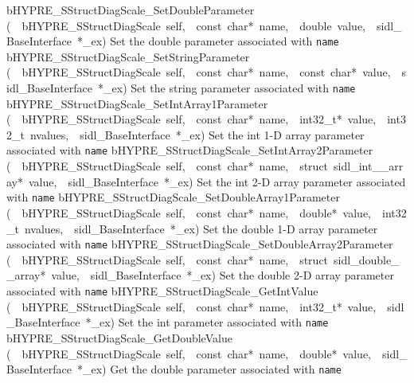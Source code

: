 \documentclass{article}
\begin{document}
\begin{cxxentry}
\begin{cxxentry}
\begin{cxxnames}
        {bHYPRE\_SStructDiagScale\_SetDoubleParameter}
        {(\ \ bHYPRE\_SStructDiagScale\ self,\ \ const\ char*\ name,\ \ double\ value,\ \ sidl\_BaseInterface\ *\_ex)}
        {
Set the double parameter associated with {\tt name}}
        {}
\label{cxx.8.1.18}
        {bHYPRE\_SStructDiagScale\_SetStringParameter}
        {(\ \ bHYPRE\_SStructDiagScale\ self,\ \ const\ char*\ name,\ \ const\ char*\ value,\ \ sidl\_BaseInterface\ *\_ex)}
        {
Set the string parameter associated with {\tt name}}
        {}
\label{cxx.8.1.19}
        {bHYPRE\_SStructDiagScale\_SetIntArray1Parameter}
        {(\ \ bHYPRE\_SStructDiagScale\ self,\ \ const\ char*\ name,\ \ int32\_t*\ value,\ \ int32\_t\ nvalues,\ \ sidl\_BaseInterface\ *\_ex)}
        {
Set the int 1-D array parameter associated with {\tt name}}
        {}
\label{cxx.8.1.20}
        {bHYPRE\_SStructDiagScale\_SetIntArray2Parameter}
        {(\ \ bHYPRE\_SStructDiagScale\ self,\ \ const\ char*\ name,\ \ struct\ sidl\_int\_\_array*\ value,\ \ sidl\_BaseInterface\ *\_ex)}
        {
Set the int 2-D array parameter associated with {\tt name}}
        {}
\label{cxx.8.1.21}
        {bHYPRE\_SStructDiagScale\_SetDoubleArray1Parameter}
        {(\ \ bHYPRE\_SStructDiagScale\ self,\ \ const\ char*\ name,\ \ double*\ value,\ \ int32\_t\ nvalues,\ \ sidl\_BaseInterface\ *\_ex)}
        {
Set the double 1-D array parameter associated with {\tt name}}
        {}
\label{cxx.8.1.22}
        {bHYPRE\_SStructDiagScale\_SetDoubleArray2Parameter}
        {(\ \ bHYPRE\_SStructDiagScale\ self,\ \ const\ char*\ name,\ \ struct\ sidl\_double\_\_array*\ value,\ \ sidl\_BaseInterface\ *\_ex)}
        {
Set the double 2-D array parameter associated with {\tt name}}
        {}
\label{cxx.8.1.23}
        {bHYPRE\_SStructDiagScale\_GetIntValue}
        {(\ \ bHYPRE\_SStructDiagScale\ self,\ \ const\ char*\ name,\ \ int32\_t*\ value,\ \ sidl\_BaseInterface\ *\_ex)}
        {
Set the int parameter associated with {\tt name}}
        {}
\label{cxx.8.1.24}
        {bHYPRE\_SStructDiagScale\_GetDoubleValue}
        {(\ \ bHYPRE\_SStructDiagScale\ self,\ \ const\ char*\ name,\ \ double*\ value,\ \ sidl\_BaseInterface\ *\_ex)}
        {
Get the double parameter associated with {\tt name}}
        {}
\label{cxx.8.1.25}

\end{cxxnames}
\end{cxxentry}
\end{cxxentry}
\end{document}
